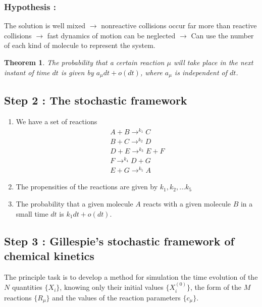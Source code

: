 \documentclass[11pt,a4paper]{article}
\newtheorem{theorem}{Theorem}
\begin{document}
\subsubsection{Hypothesis :}
The solution is well mixed $\rightarrow$ nonreactive collisions occur far more than reactive collisions $\rightarrow$ fast dynamics of motion can be neglected $\rightarrow$ Can use the number of each kind of molecule to represent the system.

\begin{theorem}
The probability that a certain reaction $\mu$ will take place in the next instant of time $dt$ is given by $a_{\mu}dt + o(dt)$, where $a_{\mu}$ is independent of $dt$.
\end{theorem}

\subsection{Step 2 : The stochastic framework}
\begin{enumerate}
  \item We have a set of reactions
    \begin{gather}
      {A + B \rightarrow^{k_1} C}  \\
      {B + C \rightarrow^{k_2} D}  \\
      {D + E \rightarrow^{k_3} E + F} \\
      {F \rightarrow^{k_4} D + G} \\
      {E + G \rightarrow^{k_5} A}
    \end{gather}
  \item The propensities of the reactions are given by $k_{1}, k_{2}, ... k_{5}$
  \item The probability that a given molecule $A$ reacts with a given molecule $B$ in a small time $dt$ is $k_{1}dt + o(dt)$.
\end{enumerate}

\subsection{Step 3 : Gillespie's stochastic framework of chemical kinetics}
The principle task is to develop a method for simulation the time evolution of the $N$ quantities $\{X_{i}\}$, knowing only their initial values $\{X_{i}^{(0)}\}$, the form of the $M$ reactions $\{R_{\mu}\}$ and the values of the reaction parameters $\{c_{\mu}\}$.
\end{document}
